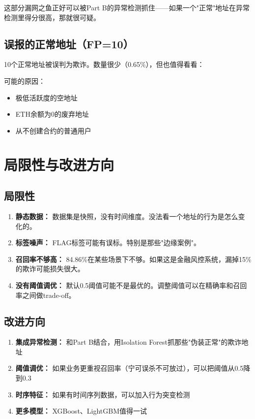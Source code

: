 \documentclass[12pt,a4paper]{article}
\begin{document}
这部分漏网之鱼正好可以被Part B的异常检测抓住——如果一个"正常"地址在异常检测里得分很高，那就很可疑。

\subsection{误报的正常地址（FP=10）}

10个正常地址被误判为欺诈。数量很少（0.65\%），但也值得看看：

可能的原因：
\begin{itemize}
    \item 极低活跃度的空地址
    \item ETH余额为0的废弃地址
    \item 从不创建合约的普通用户
\end{itemize}

\section{局限性与改进方向}

\subsection{局限性}

\begin{enumerate}
    \item \textbf{静态数据：} 数据集是快照，没有时间维度。没法看一个地址的行为是怎么变化的。
    \item \textbf{标签噪声：} FLAG标签可能有误标。特别是那些"边缘案例"。
    \item \textbf{召回率不够高：} 84.86\%在某些场景下不够。如果这是金融风控系统，漏掉15\%的欺诈可能损失很大。
    \item \textbf{没有阈值调优：} 默认0.5阈值可能不是最优的。调整阈值可以在精确率和召回率之间做trade-off。
\end{enumerate}

\subsection{改进方向}

\begin{enumerate}
    \item \textbf{集成异常检测：} 和Part B结合，用Isolation Forest抓那些"伪装正常"的欺诈地址
    \item \textbf{阈值调优：} 如果业务更重视召回率（宁可误杀不可放过），可以把阈值从0.5降到0.3
    \item \textbf{时序特征：} 如果有时间序列数据，可以加入行为突变检测
    \item \textbf{更多模型：} XGBoost、LightGBM值得一试
\end{enumerate}
\end{document}
